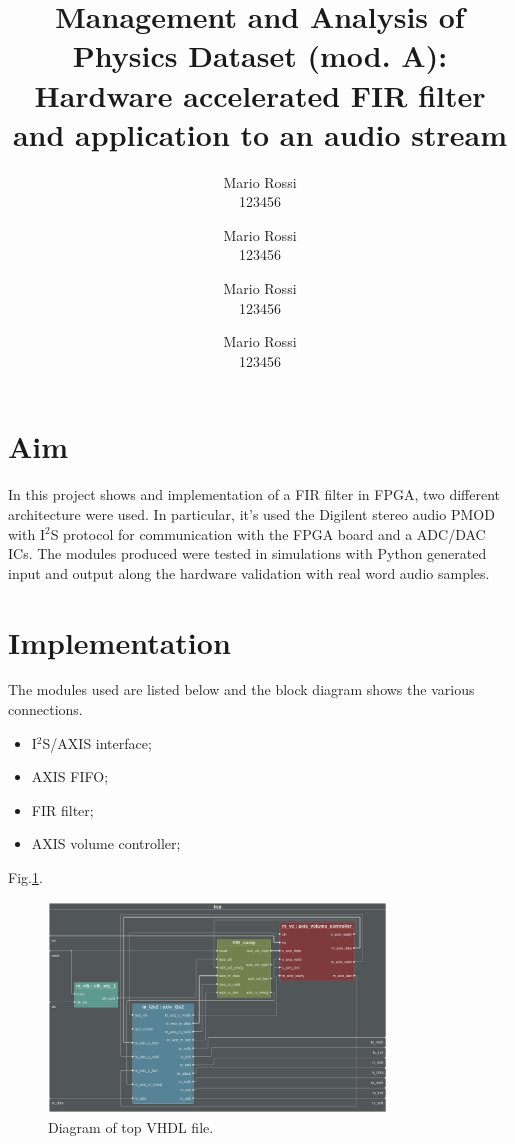\documentclass[11pt, a4paper]{article}
\begin{document}
\author{Mario Rossi\\123456  \and Mario Rossi\\123456 \and Mario Rossi\\123456 \and Mario Rossi\\123456}
\title{\textbf{Management and Analysis of Physics Dataset (mod. A): \\ Hardware accelerated FIR filter and application to an audio stream}}
\maketitle

\section{Aim}
In this project shows and implementation of a FIR filter in FPGA, two different architecture were used. In particular, it's used the Digilent stereo audio PMOD with I$^2$S protocol for communication with the FPGA board and a ADC/DAC ICs. The modules produced were tested in simulations with Python generated input and output along the hardware validation with real word audio samples.





\section{Implementation}
The modules used are listed below and the block diagram shows the various connections.
\begin{itemize}
    \item I$^2$S/AXIS interface;
    \item AXIS FIFO;
    \item FIR filter;
    \item AXIS volume controller;
    
\end{itemize}

Fig.\ref{fig:Block_diagram}.

\vspace{1cm}
\begin{figure}[h!]
    \centering
    \includegraphics[width=0.8\textwidth]{images/BD_gr_cfg.png}
    \caption{\label{fig:Block_diagram} Diagram of top VHDL file.}
\end{figure}
\vspace{1cm}
\end{document}

